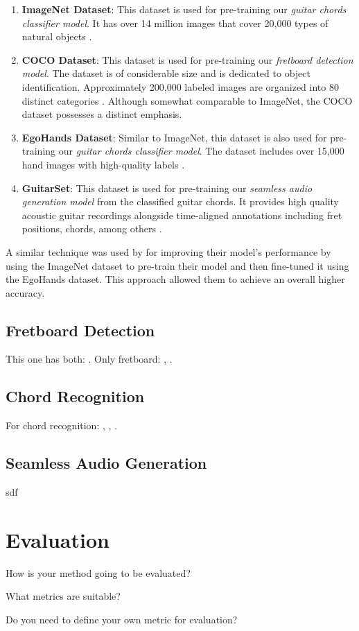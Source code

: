 \documentclass[10pt,twocolumn,letterpaper]{article}
\begin{document}
\begin{enumerate}[label=\arabic*)]
    \item \textbf{ImageNet Dataset}: This dataset is used for pre-training our \emph{guitar chords classifier model}. It has over 14 million images that cover 20,000 types of natural objects \cite{russakovsky2015imagenetlargescalevisual}.
    \item \textbf{COCO Dataset}: This dataset is used for pre-training our \emph{fretboard detection model}. The dataset is of considerable size and is dedicated to object identification. Approximately 200,000 labeled images are organized into 80 distinct categories \cite{lin2015microsoftcococommonobjects}. Although somewhat comparable to ImageNet, the COCO dataset possesses a distinct emphasis.
    \item \textbf{EgoHands Dataset}: Similar to ImageNet, this dataset is also used for pre-training our \emph{guitar chords classifier model}. The dataset includes over 15,000 hand images with high-quality labels \cite{Bambach_2015_ICCV}.
    \item \textbf{GuitarSet}: This dataset is used for pre-training our \emph{seamless audio generation model} from the classified guitar chords. It provides high quality acoustic guitar recordings alongside time-aligned annotations including fret positions, chords, among others \cite{Xi2018}.
\end{enumerate}

A similar technique was used by \cite{Jadhav_transferlearning} for improving their model's performance by using the ImageNet dataset to pre-train their model and then fine-tuned it using the EgoHands dataset. This approach allowed them to achieve an overall higher accuracy.

\subsection{Fretboard Detection}
This one has both: \cite{guitar-chords-daewp_dataset}. 
Only fretboard: \cite{guitar-ppfil_dataset}, \cite{done-npcll_dataset}.

\subsection{Chord Recognition}
For chord recognition: \cite{guitar-chord-tvon8_dataset}, \cite{guitar-chord-bounding-box_dataset}, \cite{guitar-chord-handshape_dataset}.

\subsection{Seamless Audio Generation}
sdf

\section{Evaluation}

How is your method going to be evaluated?

What metrics are suitable?

Do you need to define your own metric for evaluation?

{\small


}
\end{document}
